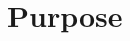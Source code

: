 \documentclass[journal=jctc,manuscript=article]{achemso}
\begin{document}
\begin{abstract}

\end{abstract}

\maketitle

\section*{Purpose}

\end{document}
